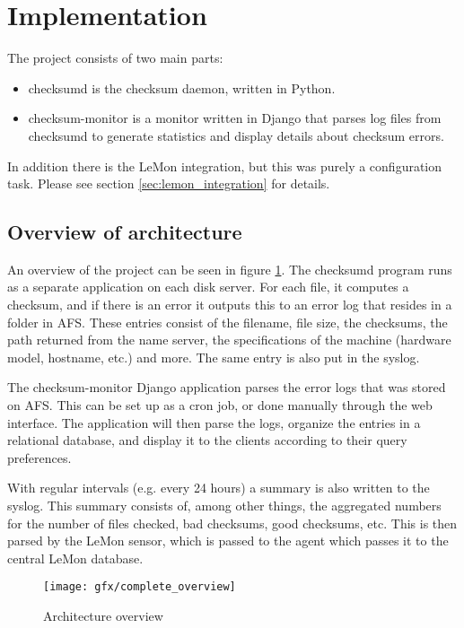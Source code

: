 \section{Implementation}
The project consists of two main parts:
\begin{itemize}
\item checksumd is the checksum daemon, written in Python. 
\item checksum-monitor is a monitor written in Django that parses log files from checksumd to generate statistics and display details about checksum errors.
\end{itemize}

In addition there is the LeMon integration, but this was purely a configuration task. Please see section \ref{sec:lemon_integration} for details. 

\subsection{Overview of architecture}
An overview of the project can be seen in figure \ref{fig:complete_overview}. The checksumd program runs as a separate application on each disk server. For each file, it computes a checksum, and if there is an error it outputs this to an error log that resides in a folder in AFS. These entries consist of the filename, file size, the checksums, the path returned from the name server, the specifications of the machine (hardware model, hostname, etc.) and more. The same entry is also put in the syslog. 

The checksum-monitor Django application parses the error logs that was stored on AFS. This can be set up as a cron job, or done manually through the web interface. The application will then parse the logs, organize the entries in a relational database, and display it to the clients according to their query preferences.

With regular intervals (e.g. every 24 hours) a summary is also written to the syslog. This summary consists of, among other things, the aggregated numbers for the number of files checked, bad checksums, good checksums, etc. This is then parsed by the LeMon sensor, which is passed to the agent which passes it to the central LeMon database.


\begin{figure}[ht]
\centering
\texttt{[image: gfx/complete\_overview]}
\caption{Architecture overview}
\label{fig:complete_overview}
\end{figure}

